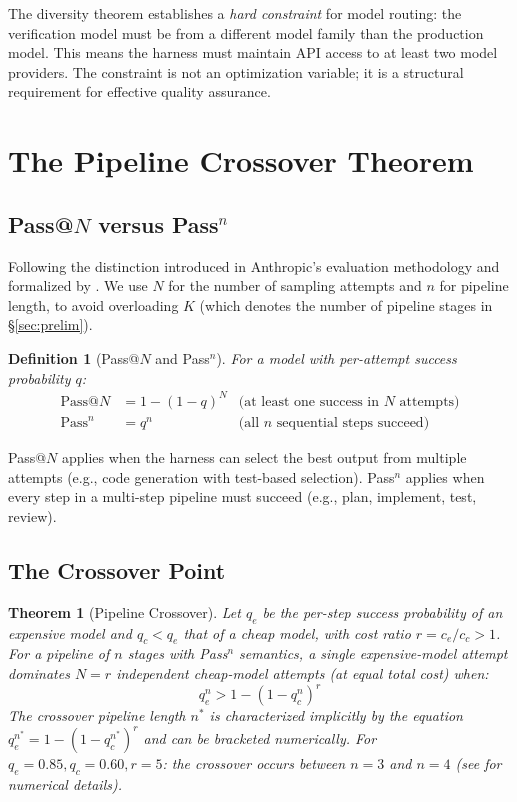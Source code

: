 \documentclass[11pt, a4paper, copyright]{googledeepmind}
\newtheorem{definition}{Definition}[section]
\newtheorem{theorem}{Theorem}[section]
\begin{document}
The diversity theorem establishes a \emph{hard constraint} for model routing: the verification model must be from a different model family than the production model. This means the harness must maintain API access to at least two model providers. The constraint is not an optimization variable; it is a structural requirement for effective quality assurance.


\section{The Pipeline Crossover Theorem}
\label{sec:crossover}

\subsection{Pass@$N$ versus Pass${}^n$}

Following the distinction introduced in Anthropic's evaluation methodology and formalized by \citet{chen2021codex}. We use $N$ for the number of sampling attempts and $n$ for pipeline length, to avoid overloading $K$ (which denotes the number of pipeline stages in \S\ref{sec:prelim}).

\begin{definition}[Pass@$N$ and Pass${}^n$]
For a model with per-attempt success probability $q$:
\begin{align}
\text{Pass@}N &= 1 - (1-q)^N & \text{(at least one success in $N$ attempts)} \\
\text{Pass}^n &= q^n & \text{(all $n$ sequential steps succeed)}
\end{align}
\end{definition}

Pass@$N$ applies when the harness can select the best output from multiple attempts (e.g., code generation with test-based selection). Pass${}^n$ applies when every step in a multi-step pipeline must succeed (e.g., plan, implement, test, review).

\subsection{The Crossover Point}

\begin{theorem}[Pipeline Crossover]
\label{thm:crossover}
Let $q_e$ be the per-step success probability of an expensive model and $q_c < q_e$ that of a cheap model, with cost ratio $r = c_e / c_c > 1$. For a pipeline of $n$ stages with Pass${}^n$ semantics, a single expensive-model attempt dominates $N = r$ independent cheap-model attempts (at equal total cost) when:
\begin{equation}
q_e^n > 1 - (1 - q_c^n)^r
\end{equation}
The crossover pipeline length $n^*$ is characterized implicitly by the equation $q_e^{n^*} = 1 - (1 - q_c^{n^*})^r$ and can be bracketed numerically. For $q_e = 0.85, q_c = 0.60, r = 5$: the crossover occurs between $n = 3$ and $n = 4$ (see  for numerical details).
\end{theorem}
\end{document}
